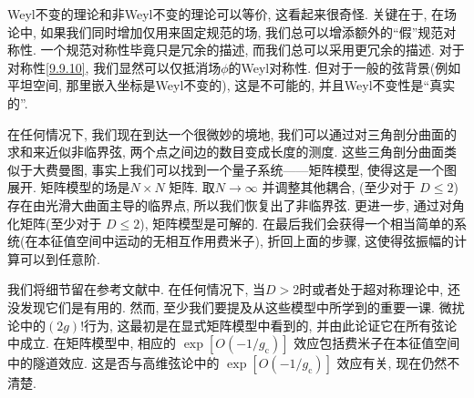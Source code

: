 Weyl不变的理论和非Weyl不变的理论可以等价, 这看起来很奇怪. 关键在于, 在场论中, 如果我们同时增加仅用来固定规范的场, 我们总可以增添额外的``假''规范对称性. 
一个规范对称性毕竟只是冗余的描述, 而我们总可以采用更冗余的描述. 对于对称性\eqref{9.9.10}, 我们显然可以仅抵消场$\phi$的Weyl对称性. 
但对于一般的弦背景(例如平坦空间, 那里嵌入坐标是Weyl不变的), 这是不可能的, 并且Weyl不变性是``真实的''.

在任何情况下, 我们现在到达一个很微妙的境地, 我们可以通过对三角剖分曲面的求和来近似非临界弦, 两个点之间边的数目变成长度的测度. 
这些三角剖分曲面类似于大费曼图, 事实上我们可以找到一个量子系统——矩阵模型, 使得这是一个图展开. 
矩阵模型的场是$N \times N$ 矩阵. 取$N \rightarrow \infty$ 并调整其他耦合, (至少对于 $D \leq 2$)存在由光滑大曲面主导的临界点, 
所以我们恢复出了非临界弦. 更进一步, 通过对角化矩阵(至少对于 $D \leq 2$), 矩阵模型是可解的. 
在最后我们会获得一个相当简单的系统(在本征值空间中运动的无相互作用费米子), 折回上面的步骤, 这使得弦振幅的计算可以到任意阶.

我们将细节留在参考文献中. 在任何情况下, 当$D>2$时或者处于超对称理论中, 还没发现它们是有用的. 
然而, 至少我们要提及从这些模型中所学到的重要一课. 微扰论中的$(2g)!$行为, 这最初是在显式矩阵模型中看到的, 并由此论证它在所有弦论中成立. 
在矩阵模型中, 相应的 $\exp [O(-1 / g_{\mathrm{c}})]$ 效应包括费米子在本征值空间中的隧道效应. 
这是否与高维弦论中的 $\exp [O(-1 / g_{\mathrm{c}})]$ 效应有关, 现在仍然不清楚.
